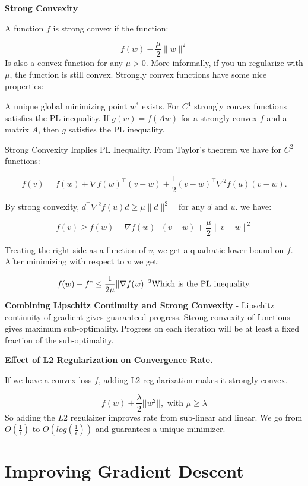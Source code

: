 \documentclass[
]{article}
\begin{document}
\textbf{Strong Convexity}

A function \(f\) is strong convex if the function:

\[
f(w) - \frac{\mu}{2} \|w\|^2
\]
Is also a convex function for any \(\mu > 0\). More informally, if you un-regularize with \(\mu\), the function is still convex. Strongly convex functions have some nice properties:

A unique global minimizing point \(w^*\) exists.
For \(C^1\) strongly convex functions satisfies the PL inequality.
If \(g(w) = f(Aw)\) for a strongly convex \(f\) and a matrix \(A\), then \(g\) satisfies the PL inequality.

Strong Convexity Implies PL Inequality. From Taylor's theorem we have for \(C^2\) functions:

\[
f(v) = f(w) + \nabla f(w)^\top (v - w) + \frac{1}{2} (v - w)^\top \nabla^2 f(u) (v - w).
\]

By strong convexity, \(d^\top \nabla^2 f(u) d \geq \mu \|d\|^2 \quad \text{for any } d \text{ and } u.\) we have:

\[
f(v) \geq f(w) + \nabla f(w)^\top (v - w) + \frac{\mu}{2} \|v - w\|^2
\]

Treating the right side as a function of \(v\), we get a quadratic lower bound on \(f\). After minimizing with respect to \(v\) we get:

\[
f(w) - f^* \leq \frac{1}{2\mu} \|\nabla f(w)\|^2\\
\text{Which is the PL inequality.}
\]
\textbf{Combining Lipschitz Continuity and Strong Convexity} - Lipschitz continuity of gradient gives guaranteed progress. Strong convexity of functions gives maximum sub-optimality. Progress on each iteration will be at least a fixed fraction of the sub-optimality.

\textbf{Effect of L2 Regularization on Convergence Rate.}

If we have a convex loss \(f\), adding L2-regularization makes it strongly-convex.

\[
f(w) + \frac{\lambda}{2} ||w^2||, \text{ with } \mu \ge \lambda
\]
So adding the \(L2\) regulaizer improves rate from sub-linear and linear. We go from \(O(\frac{1}{\epsilon})\) to \(O(log(\frac{1}{\epsilon}))\) and guarantees a unique minimizer.

\section{Improving Gradient Descent}\label{improving-gradient-descent}
\end{document}
